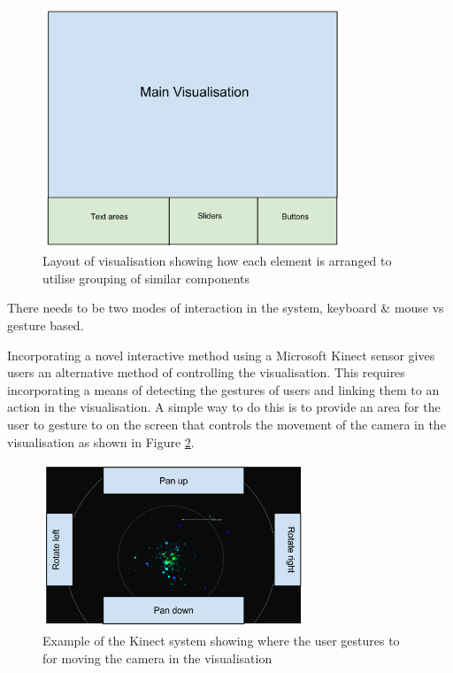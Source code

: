 \begin{enumerate}
\begin{figure}[H]
  \centering
      \includegraphics[width=0.8\textwidth]{images/clutter.pdf}
  \caption[Layout of visualisation]{Layout of visualisation showing how each
element is arranged to utilise grouping of similar components}
  \label{fig:clutter}
\end{figure}

\clearpage
{\bf  \item[R8.] There needs to be two modes of interaction in the system,
keyboard \& mouse vs gesture based.}

Incorporating a novel interactive method using a Microsoft Kinect sensor
gives users an alternative method of controlling the visualisation. This
requires incorporating a
means of detecting the gestures of users and linking them to an action in the
visualisation. A simple way to do this is to provide an area for the user to
gesture to on the screen that controls the movement of the camera in the
visualisation as shown in Figure \ref{fig:kinectMock}.
\begin{figure}[H]
  \centering
      \includegraphics[width=0.7\textwidth]{images/mockKinect.png}
  \caption[Example of the Kinect system]{Example of the Kinect system showing
where the user gestures to for moving the camera in the visualisation}
  \label{fig:kinectMock}
\end{figure}


\end{enumerate}
